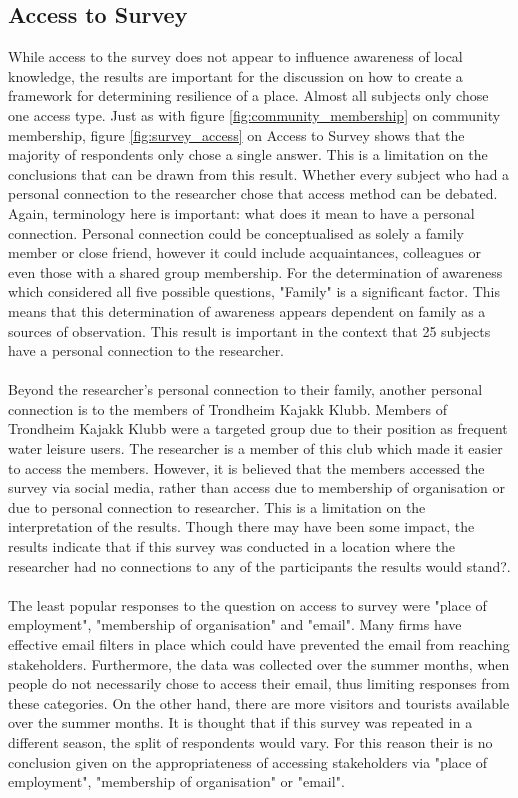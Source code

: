 \subsection{Access to Survey}
While access to the survey does not appear to influence awareness of local knowledge, the results are important for the discussion on how to create a framework for determining resilience of a place. Almost all subjects only chose one access type. Just as with figure \ref{fig:community_membership} on community membership, figure \ref{fig:survey_access} on Access to Survey shows that the majority of respondents only chose a single answer. This is a limitation on the conclusions that can be drawn from this result. Whether every subject who had a personal connection to the researcher chose that access method can be debated. Again, terminology here is important: what does it mean to have a personal connection. Personal connection could be conceptualised as solely a family member or close friend, however it could include acquaintances, colleagues or even those with a shared group membership. For the determination of awareness which considered all five possible questions, "Family" is a significant factor. This means that this determination of awareness appears dependent on family as a sources of observation. This result is important in the context that 25 subjects have a personal connection to the researcher.
\paragraph{}
Beyond the researcher's personal connection to their family, another personal connection is to the members of Trondheim Kajakk Klubb. Members of Trondheim Kajakk Klubb were a targeted group due to their position as frequent water leisure users. The researcher is a member of this club which made it easier to access the members. However, it is believed that the members accessed the survey via social media, rather than access due to  membership of organisation or due to personal connection to researcher. This is a limitation on the interpretation of the results. Though there may have been some impact, the results indicate that if this survey was conducted in a location where the researcher had no connections to any of the participants the results would stand?.
\paragraph{}
The least popular responses to the question on access to survey were "place of employment", "membership of organisation" and "email". Many firms have effective email filters in place which could have prevented the email from reaching stakeholders. Furthermore, the data was collected over the summer months, when people do not necessarily chose to access their email, thus limiting responses from these categories. On the other hand, there are more visitors and tourists available over the summer months. It is thought that if this survey was repeated in a different season, the split of respondents would vary. For this reason their is no conclusion given on the appropriateness of accessing stakeholders via "place of employment", "membership of organisation" or "email".
